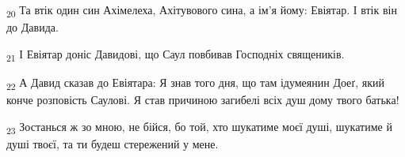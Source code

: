 \begin{tcolorbox}
\textsubscript{20} Та втік один син Ахімелеха, Ахітувового сина, а ім'я йому: Евіятар. І втік він до Давида.
\end{tcolorbox}
\begin{tcolorbox}
\textsubscript{21} І Евіятар доніс Давидові, що Саул повбивав Господніх священиків.
\end{tcolorbox}
\begin{tcolorbox}
\textsubscript{22} А Давид сказав до Евіятара: Я знав того дня, що там ідумеянин Доеґ, який конче розповість Саулові. Я став причиною загибелі всіх душ дому твого батька!
\end{tcolorbox}
\begin{tcolorbox}
\textsubscript{23} Зостанься ж зо мною, не бійся, бо той, хто шукатиме моєї душі, шукатиме й душі твоєї, та ти будеш стережений у мене.
\end{tcolorbox}
